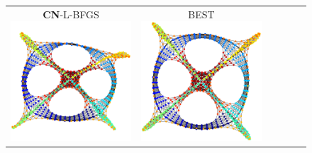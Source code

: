 \documentclass[dvipdfmx,10pt,journal,compsoc]{IEEEtran}
\begin{document}
\begin{figure}[btp]
\begin{tabular}{cccccc}
    \makecell{\small{\textsf{\textbf{CN}-L-BFGS}}                                                                                                        \\[-0.2em]\includegraphics[width=0.27\columnwidth]{individual/vis/dwt_1005_CN-L-BFGS.png}} &
    \makecell{\small{\textsf{BEST}}                                                                                                                      \\[-0.2em]\includegraphics[width=0.27\columnwidth]{individual/vis/opt_dwt_1005.png}} \\


\end{tabular}
\end{figure}
\end{document}

